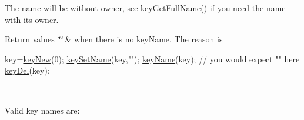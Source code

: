 The name will be without owner, see \hyperlink{group__keyname_gaaba1494a5ffc976e0e56c43f4334a23c}{key\+Get\+Full\+Name()} if you need the name with its owner.


\begin{DoxyRetVals}{Return values}
{\em \char`\"{}\char`\"{}} & when there is no key\+Name. The reason is 
\begin{DoxyCode}
key=\hyperlink{group__key_gad23c65b44bf48d773759e1f9a4d43b89}{keyNew}(0);
\hyperlink{group__keyname_ga7699091610e7f3f43d2949514a4b35d9}{keySetName}(key,\textcolor{stringliteral}{""});
\hyperlink{group__keyname_ga8e805c726a60da921d3736cda7813513}{keyName}(key); \textcolor{comment}{// you would expect "" here}
\hyperlink{group__key_ga3df95bbc2494e3e6703ece5639be5bb1}{keyDel}(key);
\end{DoxyCode}
\\
\hline
\end{DoxyRetVals}
Valid key names are\+:


